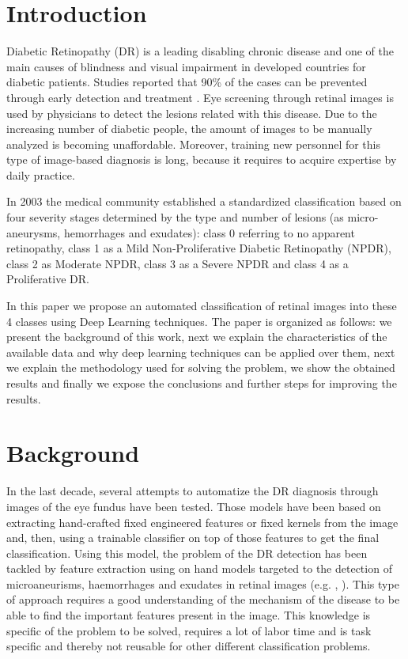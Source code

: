 \documentclass{IOS-Book-Article}
\begin{document}
\thispagestyle{empty}
\pagestyle{empty}

\section{Introduction}

Diabetic Retinopathy (DR) is a leading disabling chronic disease  and  one of the main causes of blindness and visual impairment in developed countries for diabetic patients. Studies reported that 90\% of the cases can be prevented through early detection and treatment \cite{torrents15}. Eye screening through retinal images is used by physicians to detect the lesions related with this disease. Due to the increasing number of diabetic people, the amount of images to be manually analyzed is becoming unaffordable. Moreover, training new personnel for this type of image-based diagnosis is long, because it requires to acquire expertise by daily practice. 

In 2003 the medical community established a standardized classification based on four severity stages \cite{diaclass} determined by the type and number of lesions (as micro-aneurysms, hemorrhages and exudates): class 0 referring to no apparent retinopathy, class 1 as a Mild Non-Proliferative Diabetic Retinopathy (NPDR), class 2 as Moderate NPDR, class 3 as a Severe NPDR and class 4 as a Proliferative DR. 

In this paper we propose an automated classification of retinal images into these 4 classes using Deep Learning techniques. The paper is organized as follows: we present the background of this work, next we explain the characteristics of the available data and why deep learning techniques can be applied over them, next we explain the methodology used for solving the problem, we show the obtained results and finally we expose the conclusions and further steps for improving the results.

\section{Background}

In the last decade, several attempts to automatize the DR diagnosis through images of the eye fundus have been tested. Those models have been based on extracting hand-crafted fixed engineered features or fixed kernels from the image and, then, using a trainable classifier on top of those features to get the final classification. 
Using this model, the problem of the DR detection has been tackled by feature extraction using on hand models targeted to the detection of microaneurisms, haemorrhages and exudates in retinal images (e.g. \cite{sudha2014}, \cite{torrents15}). This type of approach requires a good understanding of the mechanism of the disease to be able to find the important features present in the image. This knowledge is specific of the problem to be solved, requires a lot of labor time and is task specific and thereby not reusable for other different classification problems. 
\end{document}
